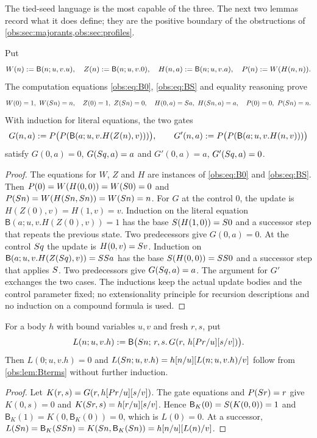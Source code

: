 The tied-seed language is the most capable of the three. The next two lemmas
record what it does define; they are the positive boundary of the obstructions
of \cref{obs:sec:majorants,obs:sec:profiles}.

\begin{lemma}
\label{obs:lem:Bterms}
Put
\[
W(n)\mathrel{:=}\mathsf{B}(n;u,v.u),\quad
Z(n)\mathrel{:=}\mathsf{B}(n;u,v.0),\quad
H(n,a)\mathrel{:=}\mathsf{B}(n;u,v.a),\quad
P(n)\mathrel{:=} W(H(n,n)).
\]
The computation equations \eqref{obs:eq:B0}, \eqref{obs:eq:BS} and equality
reasoning prove
\[
W(0)=1,\ W(\Suc n)=n,\quad Z(0)=1,\ Z(\Suc n)=0,\quad
H(0,a)=\Suc a,\ H(\Suc n,a)=a,\quad P(0)=0,\ P(\Suc n)=n .
\]
With induction for literal equations, the two gates
\[
G(n,a)\mathrel{:=} P\bigl(P(\mathsf{B}(a;u,v.H(Z(n),v)))\bigr),\qquad
G'(n,a)\mathrel{:=} P\bigl(P(\mathsf{B}(a;u,v.H(n,v)))\bigr)
\]
satisfy $G(0,a)=0$, $G(S q,a)=a$ and $G'(0,a)=a$, $G'(S q,a)=0$.
\end{lemma}

\begin{proof}
The equations for $W$, $Z$ and $H$ are instances of \eqref{obs:eq:B0} and
\eqref{obs:eq:BS}. Then $P(0)=W(H(0,0))=W(S 0)=0$ and
$P(S n)=W(H(S n,S n))=W(S n)=n$. For $G$ at the control $0$, the
update is $H(Z(0),v)=H(1,v)=v$. Induction on the literal equation
$\mathsf{B}(a;u,v.H(Z(0),v))=1$ has the base $S(H(1,0))=S 0$ and a
successor step that repeats the previous state. Two predecessors give
$G(0,a)=0$. At the control $S q$ the update is $H(0,v)=S v$. Induction on
$\mathsf{B}(a;u,v.H(Z(S q),v))=SS a$ has the base
$S(H(0,0))=SS 0$ and a successor step that applies $S$. Two
predecessors give $G(S q,a)=a$. The argument for $G'$ exchanges the two
cases. The inductions keep the actual update bodies and the control parameter
fixed; no extensionality principle for recursion descriptions and no induction
on a compound formula is used.
\end{proof}

\begin{lemma}
\label{obs:lem:zerostart}
For a body $h$ with bound variables $u,v$ and fresh $r,s$, put
\[
L(n;u,v.h)\mathrel{:=}
\mathsf{B}\bigl(S n;\,r,s.\,G(r,\,h[P r/u][s/v])\bigr).
\]
Then $L(0;u,v.h)=0$ and
$L(S n;u,v.h)=h[n/u][L(n;u,v.h)/v]$ follow from
\cref{obs:lem:Bterms} without further induction.
\end{lemma}

\begin{proof}
Let $K(r,s)=G(r,h[P r/u][s/v])$. The gate equations and
$P(S r)=r$ give $K(0,s)=0$ and $K(S r,s)=h[r/u][s/v]$.
Hence $\mathsf{B}_K(0)=S(K(0,0))=1$ and
$\mathsf{B}_K(1)=K(0,\mathsf{B}_K(0))=0$, which is $L(0)=0$. At a successor,
$L(S n)=\mathsf{B}_K(SS n)=K(S n,\mathsf{B}_K(S n))
=h[n/u][L(n)/v]$.
\end{proof}

